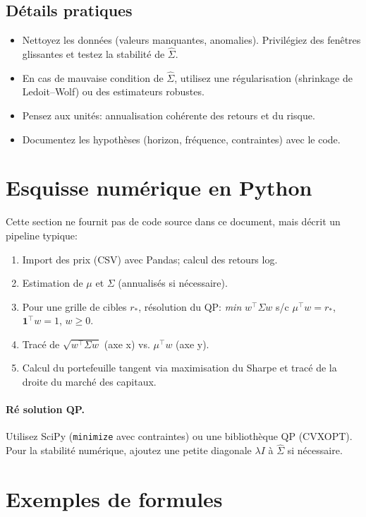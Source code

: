 \documentclass[11pt,a4paper]{article}
\begin{document}
\subsection{Détails pratiques}
\begin{itemize}
  \item Nettoyez les donn\'ees (valeurs manquantes, anomalies). Privil\'egiez des fen\^etres glissantes et testez la stabilit\'e de $\hat{\Sigma}$.
  \item En cas de mauvaise condition de $\hat{\Sigma}$, utilisez une r\'egularisation (shrinkage de Ledoit--Wolf) ou des estimateurs robustes.
  \item Pensez aux unit\'es: annualisation coh\'erente des retours et du risque.
  \item Documentez les hypoth\`eses (horizon, fr\'equence, contraintes) avec le code.
\end{itemize}

\section{Esquisse num\'erique en Python}
Cette section ne fournit pas de code source dans ce document, mais d\'ecrit un pipeline typique:
\begin{enumerate}[label=\alph*)]
  \item Import des prix (CSV) avec Pandas; calcul des retours log.
  \item Estimation de $\mu$ et $\Sigma$ (annualis\'es si n\'ecessaire).
  \item Pour une grille de cibles $r_*$, r\'esolution du QP: \emph{min} $w^\top\Sigma w$ s/c $\mu^\top w=r_*$, $\mathbf{1}^\top w=1$, $w\ge0$.
  \item Trac\'e de $\sqrt{w^\top\Sigma w}$ (axe x) vs. $\mu^\top w$ (axe y).
  \item Calcul du portefeuille tangent via maximisation du Sharpe et trac\'e de la droite du march\'e des capitaux.
\end{enumerate}

\paragraph{R\'e solution QP.} Utilisez SciPy (\texttt{minimize} avec contraintes) ou une biblioth\`eque QP (CVXOPT). Pour la stabilit\'e num\'erique, ajoutez une petite diagonale $\lambda I$ \`a $\hat{\Sigma}$ si n\'ecessaire.

\section{Exemples de formules}
\end{document}

